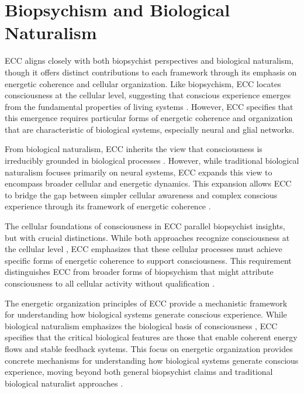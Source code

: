 \section{Biopsychism and Biological Naturalism}

ECC aligns closely with both biopsychist perspectives and biological naturalism, though it offers distinct contributions to each framework through its emphasis on energetic coherence and cellular organization. Like biopsychism, ECC locates consciousness at the cellular level, suggesting that conscious experience emerges from the fundamental properties of living systems \cite{edwards2005consciousness, shapiro2007bacteria}. However, ECC specifies that this emergence requires particular forms of energetic coherence and organization that are characteristic of biological systems, especially neural and glial networks.

From biological naturalism, ECC inherits the view that consciousness is irreducibly grounded in biological processes \cite{searle2017biological}. However, while traditional biological naturalism focuses primarily on neural systems, ECC expands this view to encompass broader cellular and energetic dynamics. This expansion allows ECC to bridge the gap between simpler cellular awareness and complex conscious experience through its framework of energetic coherence \cite{van2006principles}.

The cellular foundations of consciousness in ECC parallel biopsychist insights, but with crucial distinctions. While both approaches recognize consciousness at the cellular level \cite{lyon2015cognitive}, ECC emphasizes that these cellular processes must achieve specific forms of energetic coherence to support consciousness. This requirement distinguishes ECC from broader forms of biopsychism that might attribute consciousness to all cellular activity without qualification \cite{margulis2000life}.

The energetic organization principles of ECC provide a mechanistic framework for understanding how biological systems generate conscious experience. While biological naturalism emphasizes the biological basis of consciousness \cite{searle1992rediscovery}, ECC specifies that the critical biological features are those that enable coherent energy flows and stable feedback systems. This focus on energetic organization provides concrete mechanisms for understanding how biological systems generate conscious experience, moving beyond both general biopsychist claims and traditional biological naturalist approaches \cite{thompson2010mind}.

